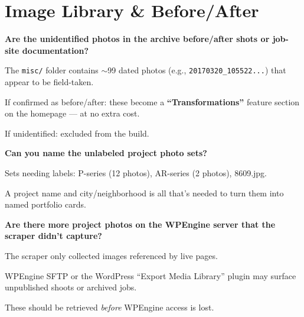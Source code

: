 \documentclass[11pt, letterpaper]{article}
\begin{document}
\section{Image Library \& Before/After}

\begin{checklist}
  \item \textbf{Are the unidentified photos in the archive before/after shots or
        job-site documentation?}
    \begin{checklist}
      \item The \texttt{misc/} folder contains $\sim$99 dated photos (e.g.,
            \texttt{20170320\_105522...}) that appear to be field-taken.
      \item If confirmed as before/after: these become a \textbf{``Transformations''}
            feature section on the homepage --- at no extra cost.
      \item If unidentified: excluded from the build.
    \end{checklist}

  \item \textbf{Can you name the unlabeled project photo sets?}
    \begin{checklist}
      \item Sets needing labels: P-series (12 photos), AR-series (2 photos), 8609.jpg.
      \item A project name and city/neighborhood is all that's needed to turn
            them into named portfolio cards.
    \end{checklist}

  \item \textbf{Are there more project photos on the WPEngine server that the
        scraper didn't capture?}
    \begin{checklist}
      \item The scraper only collected images referenced by live pages.
      \item WPEngine SFTP or the WordPress ``Export Media Library'' plugin may
            surface unpublished shoots or archived jobs.
      \item These should be retrieved \emph{before} WPEngine access is lost.
    \end{checklist}
\end{checklist}

\end{document}
